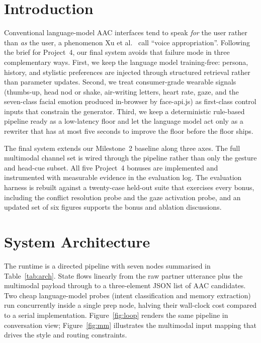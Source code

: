 \documentclass[10pt,letterpaper]{article}
\begin{document}
\section{Introduction}
Conventional language-model AAC interfaces tend to speak \textit{for} the
user rather than \textit{as} the user, a phenomenon Xu et al.~\cite{xu2025voice}
call ``voice appropriation''. Following the brief for Project~4, our
final system avoids that failure mode in three complementary ways.
First, we keep the language model training-free: persona, history, and
stylistic preferences are injected through structured retrieval rather
than parameter updates. Second, we treat consumer-grade wearable
signals (thumbs-up, head nod or shake, air-writing letters, heart
rate, gaze, and the seven-class facial emotion produced in-browser by
face-api.js) as first-class control inputs that constrain the
generator. Third, we keep a deterministic rule-based pipeline ready as
a low-latency floor and let the language model act only as a rewriter
that has at most five seconds to improve the floor before the floor
ships.

The final system extends our Milestone~2 baseline along three axes.
The full multimodal channel set is wired through the pipeline rather
than only the gesture and head-cue subset. All five Project~4 bonuses
are implemented and instrumented with measurable evidence in the
evaluation log. The evaluation harness is rebuilt against a twenty-case
held-out suite that exercises every bonus, including the conflict
resolution probe and the gaze activation probe, and an updated set of
six figures supports the bonus and ablation discussions.

\section{System Architecture}
The runtime is a directed pipeline with seven nodes summarised in
Table~\ref{tab:arch}. State flows linearly from the raw partner
utterance plus the multimodal payload through to a three-element JSON
list of AAC candidates. Two cheap language-model probes (intent
classification and memory extraction) run concurrently inside a single
prep node, halving their wall-clock cost compared to a serial
implementation. Figure~\ref{fig:loop} renders the same pipeline in
conversation view; Figure~\ref{fig:mm} illustrates the multimodal
input mapping that drives the style and routing constraints.
\end{document}
